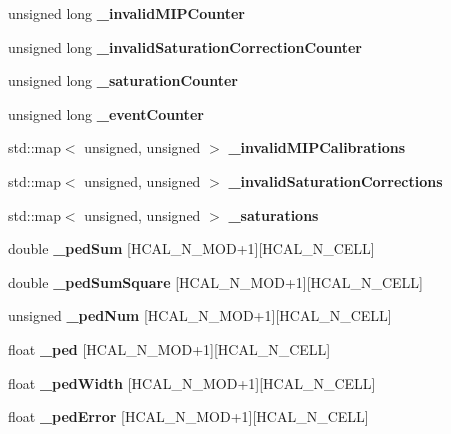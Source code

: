 \begin{DoxyCompactItemize}
\item 
unsigned long {\bfseries \_\-invalidMIPCounter}\label{classCALICE_1_1IntegratedHcalCalibrationProcessor_a8abdbee26c81f4aa9336ff5b07ef9cde}

\item 
unsigned long {\bfseries \_\-invalidSaturationCorrectionCounter}\label{classCALICE_1_1IntegratedHcalCalibrationProcessor_a34510ab0a63023762ef2eb82b3e57587}

\item 
unsigned long {\bfseries \_\-saturationCounter}\label{classCALICE_1_1IntegratedHcalCalibrationProcessor_aaf95bbbe9b7d96f34c900eaedc800a15}

\item 
unsigned long {\bfseries \_\-eventCounter}\label{classCALICE_1_1IntegratedHcalCalibrationProcessor_a244b0feb4e3c0dbc80cdb881d33531a0}

\item 
std::map$<$ unsigned, unsigned $>$ {\bfseries \_\-invalidMIPCalibrations}\label{classCALICE_1_1IntegratedHcalCalibrationProcessor_a865d6e28f28638bf3af375cb31555db4}

\item 
std::map$<$ unsigned, unsigned $>$ {\bfseries \_\-invalidSaturationCorrections}\label{classCALICE_1_1IntegratedHcalCalibrationProcessor_a1a8724c11472e790d565b76438f3d6cc}

\item 
std::map$<$ unsigned, unsigned $>$ {\bfseries \_\-saturations}\label{classCALICE_1_1IntegratedHcalCalibrationProcessor_aec10a6498f7f035f9909bfc1d87aeeb7}

\item 
double {\bfseries \_\-pedSum} [HCAL\_\-N\_\-MOD+1][HCAL\_\-N\_\-CELL]\label{classCALICE_1_1IntegratedHcalCalibrationProcessor_a62f50a5f4d2f7b8f1a346c01f6b0d8df}

\item 
double {\bfseries \_\-pedSumSquare} [HCAL\_\-N\_\-MOD+1][HCAL\_\-N\_\-CELL]\label{classCALICE_1_1IntegratedHcalCalibrationProcessor_a452abcc49cbfe1c24f9671d1864c39a8}

\item 
unsigned {\bfseries \_\-pedNum} [HCAL\_\-N\_\-MOD+1][HCAL\_\-N\_\-CELL]\label{classCALICE_1_1IntegratedHcalCalibrationProcessor_aadb43e8133ddf7a6fc74f6812fa65d53}

\item 
float {\bfseries \_\-ped} [HCAL\_\-N\_\-MOD+1][HCAL\_\-N\_\-CELL]\label{classCALICE_1_1IntegratedHcalCalibrationProcessor_a15da76dd2514ace90b34ec890ee49f3a}

\item 
float {\bfseries \_\-pedWidth} [HCAL\_\-N\_\-MOD+1][HCAL\_\-N\_\-CELL]\label{classCALICE_1_1IntegratedHcalCalibrationProcessor_aaf5121c45f2bd9af321b74d6247186fa}

\item 
float {\bfseries \_\-pedError} [HCAL\_\-N\_\-MOD+1][HCAL\_\-N\_\-CELL]\label{classCALICE_1_1IntegratedHcalCalibrationProcessor_aa0fd128f60f5a4b034660f0ed4c5428c}

\end{DoxyCompactItemize}


